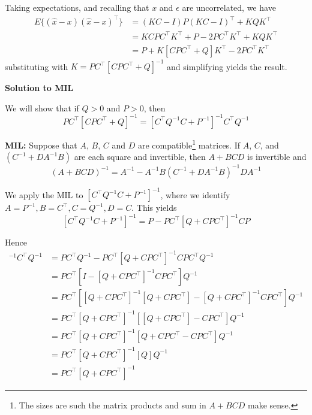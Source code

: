 \documentclass[letterpaper]{article}
\begin{document}
Taking expectations, and recalling that $x$ and $\epsilon$ are uncorrelated, we have
\begin{align*}
E\{(\hat x -x)(\hat x -x)^\top \} & = (KC-I) P (KC-I)^\top + K Q K^\top \\
&= KC P C^\top K^\top + P - 2 PC^\top K^\top + K Q K^\top\\
&= P + K [CPC^\top + Q] K^\top  -2 PC^\top K^\top
\end{align*}
substituting with $K=PC^\top [CPC^\top +Q]^{-1}$ and simplifying yields the result.



\newpage

\centerline{\bf Solution to MIL}

We will show that if $Q>0$ and $P>0$, then 
$$ PC^\top [CPC^\top +Q]^{-1}= [C^\top  Q^{-1}C+P^{-1}]^{-1}C^\top  Q^{-1}$$

\textbf{MIL:} Suppose that $A$, $B$, $C$ and $D$ are compatible\footnote{The sizes are such the matrix products and sum in $A+BCD$ make sense.} matrices. If $A$, $C$, and  $(C^{-1}+D A^{-1}B)$ are each square and invertible, then  $A+BCD$ is invertible and
    $$ (A + BCD)^{-1} = A^{-1} - A^{-1}B(C^{-1} + DA^{-1}B)^{-1}DA^{-1}$$

We apply the MIL to $[C^\top  Q^{-1}C+P^{-1}]^{-1}$, where we identify $A=P^{-1}, B=C^\top, C=Q^{-1}, D=C$. This yields
%
$$[C^\top  Q^{-1}C+P^{-1}]^{-1} = P-PC^\top [ Q + CPC^\top]^{-1} CP$$

Hence
\begin{align*}
[C^\top  Q^{-1}C+P^{-1}]^{-1}C^\top  Q^{-1} &= PC^\top  Q^{-1}-PC^\top [ Q + CPC^\top]^{-1} CPC^\top  Q^{-1} \\
&= PC^\top \left[ I - [Q+CPC^\top]^{-1} CPC^\top   \right] Q^{-1} \\
&={\scriptstyle  PC^\top \left[ [Q+CPC^\top]^{-1} [Q+CPC^\top] - [Q+CPC^\top]^{-1} CPC^\top   \right] Q^{-1}}\\
&=PC^\top [Q+CPC^\top]^{-1} \left[  [Q+CPC^\top] - CPC^\top   \right] Q^{-1}\\
&= PC^\top [Q+CPC^\top]^{-1} \left[  Q+CPC^\top - CPC^\top   \right] Q^{-1}\\
&= PC^\top [Q+CPC^\top]^{-1} \left[  Q    \right] Q^{-1}\\
&= PC^\top [Q+CPC^\top]^{-1}
\end{align*}
\end{document}
